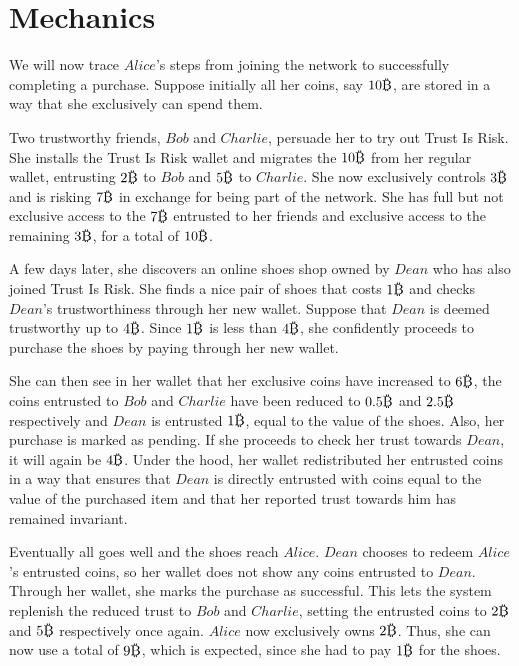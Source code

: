 \section{Mechanics}
  We will now trace $Alice$'s steps from joining the network to successfully completing a purchase. Suppose initially
  all her coins, say $10\bitcoin$, are stored in a way that she exclusively can spend them.

  Two trustworthy friends, $Bob$ and $Charlie$, persuade her to try out Trust Is Risk. She installs the Trust Is Risk
  wallet and migrates the $10\bitcoin$ from her regular wallet, entrusting $2\bitcoin$ to $Bob$ and $5\bitcoin$ to $Charlie$.
  She now exclusively controls $3\bitcoin$ and is risking $7\bitcoin$ in exchange for being part of the network. She has full
  but not exclusive access to the $7\bitcoin$ entrusted to her friends and exclusive access to the remaining $3\bitcoin$, for
  a total of $10\bitcoin$.

  A few days later, she discovers an online shoes shop owned by $Dean$ who has also joined Trust Is Risk. She finds a nice
  pair of shoes that costs $1\bitcoin$ and checks $Dean$'s trustworthiness through her new wallet. Suppose that $Dean$ is
  deemed trustworthy up to $4\bitcoin$. Since $1\bitcoin$ is less than $4\bitcoin$, she confidently proceeds to purchase the
  shoes by paying through her new wallet.

  She can then see in her wallet that her exclusive coins have increased to $6\bitcoin$, the coins entrusted to $Bob$ and
  $Charlie$ have been reduced to $0.5\bitcoin$ and $2.5\bitcoin$ respectively and $Dean$ is entrusted $1\bitcoin$, equal to
  the value of the shoes. Also, her purchase is marked as pending. If she proceeds to check her trust towards $Dean$, it will
  again be $4\bitcoin$. Under the hood, her wallet redistributed her entrusted coins in a way that ensures that $Dean$ is
  directly entrusted with coins equal to the value of the purchased item and that her reported trust towards him has remained
  invariant.

  Eventually all goes well and the shoes reach $Alice$. $Dean$ chooses to redeem $Alice$'s entrusted coins, so her wallet
  does not show any coins entrusted to $Dean$. Through her wallet, she marks the purchase as successful. This lets the system
  replenish the reduced trust to $Bob$ and $Charlie$, setting the entrusted coins to $2\bitcoin$ and $5\bitcoin$ respectively
  once again. $Alice$ now exclusively owns $2\bitcoin$. Thus, she can now use a total of $9\bitcoin$, which is expected,
  since she had to pay $1\bitcoin$ for the shoes.
